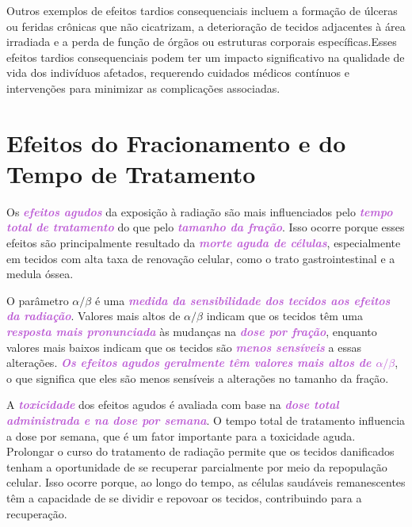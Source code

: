 \documentclass[11pt,a4paper]{article}
\newcounter{exemplo}
\begin{document}
	Outros exemplos de efeitos tardios consequenciais incluem a formação de úlceras ou feridas crônicas que não cicatrizam, a deterioração de tecidos adjacentes à área irradiada e a perda de função de órgãos ou estruturas corporais específicas.Esses efeitos tardios consequenciais podem ter um impacto significativo na qualidade de vida dos indivíduos afetados, requerendo cuidados médicos contínuos e intervenções para minimizar as complicações associadas.

\section{Efeitos do Fracionamento e do Tempo de Tratamento}

	Os \textcolor{MediumOrchid}{\textbf{\textit{efeitos agudos}}} da exposição à radiação são mais influenciados pelo \textcolor{MediumOrchid}{\textbf{\textit{tempo total de tratamento}}} do que pelo \textcolor{MediumOrchid}{\textbf{\textit{tamanho da fração}}}. Isso ocorre porque esses efeitos são principalmente resultado da \textcolor{MediumOrchid}{\textbf{\textit{morte aguda de células}}}, especialmente em tecidos com alta taxa de renovação celular, como o trato gastrointestinal e a medula óssea.

	O parâmetro $\alpha/\beta$ é uma \textcolor{MediumOrchid}{\textbf{\textit{medida da sensibilidade dos tecidos aos efeitos da radiação}}}. Valores mais altos de $\alpha/\beta$ indicam que os tecidos têm uma \textcolor{MediumOrchid}{\textbf{\textit{resposta mais pronunciada}}} às mudanças na \textcolor{MediumOrchid}{\textbf{\textit{dose por fração}}}, enquanto valores mais baixos indicam que os tecidos são \textcolor{MediumOrchid}{\textbf{\textit{menos sensíveis}}} a essas alterações. \textcolor{MediumOrchid}{\textbf{\textit{Os efeitos agudos geralmente têm valores mais altos de $\alpha/\beta$}}}, o que significa que eles são menos sensíveis a alterações no tamanho da fração.

	A \textcolor{MediumOrchid}{\textbf{\textit{toxicidade}}} dos efeitos agudos é avaliada com base na \textcolor{MediumOrchid}{\textbf{\textit{dose total administrada e na dose por semana}}}. O tempo total de tratamento influencia a dose por semana, que é um fator importante para a toxicidade aguda. Prolongar o curso do tratamento de radiação permite que os tecidos danificados tenham a oportunidade de se recuperar parcialmente por meio da repopulação celular. Isso ocorre porque, ao longo do tempo, as células saudáveis remanescentes têm a capacidade de se dividir e repovoar os tecidos, contribuindo para a recuperação.
\end{document}
